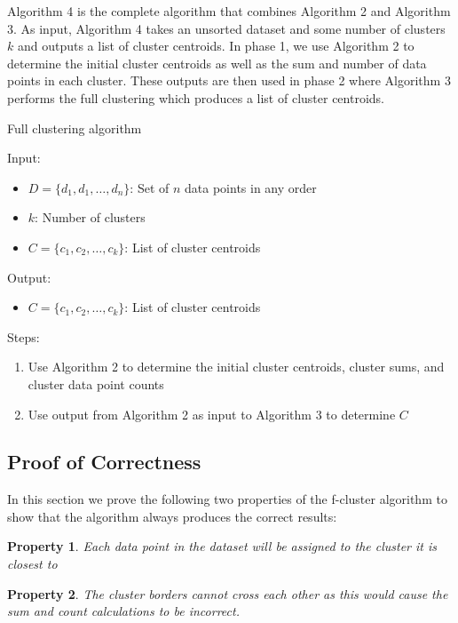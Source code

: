 \documentclass[conference,compsoc]{IEEEtran}
\newtheorem{prp}{Property}
\begin{document}
Algorithm 4 is the complete algorithm that combines Algorithm 2 and Algorithm 3. As input, Algorithm 4 takes an unsorted dataset and some number of clusters $k$ and outputs a list of cluster centroids. In phase 1, we use Algorithm 2 to determine the initial cluster centroids as well as the sum and number of data points in each cluster. These outputs are then used in phase 2 where Algorithm 3 performs the full clustering which produces a list of cluster centroids.


\begin{algorithm}\label{alg-4}
    \caption{Full clustering algorithm}
    Input:
        \begin{itemize}
            \item $D = \{d_1, d_1, \dots, d_n\}$: Set of $n$ data points in any order
            \item $k$: Number of clusters
            \item $C = \{c_1, c_2, \dots, c_k\}$: List of cluster centroids
        \end{itemize}
    Output:
        \begin{itemize}
            \item $C = \{c_1, c_2, \dots, c_k\}$: List of cluster centroids
        \end{itemize}
    Steps:
        \begin{enumerate}
            \item Use Algorithm 2 to determine the initial cluster centroids, cluster sums, and cluster data point counts
            \item Use output from Algorithm 2 as input to Algorithm 3 to determine $C$ 
        \end{enumerate}
\end{algorithm}


\subsection{Proof of Correctness}

In this section we prove the following two properties of the f-cluster algorithm to show that the algorithm always produces the correct results:
\begin{prp}\label{closest-centroid}Each data point in the dataset will be assigned to the cluster it is closest to\end{prp}
\begin{prp}\label{border-cross}The cluster borders cannot cross each other as this would cause the sum and count calculations to be incorrect.\end{prp}
\end{document}
